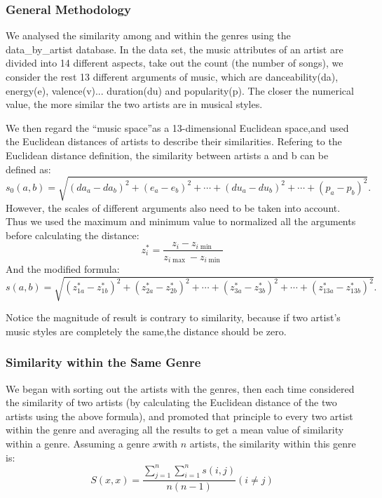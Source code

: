 \documentclass[12pt]{article}
\begin{document}
\subsubsection{General Methodology}\quad \;
We analysed the similarity among and within the genres using the data\_by\_artist database. In the data set, the music attributes of an artist are divided into 14 different aspects, take out the count (the number of songs), we consider the rest 13 different arguments of music, which are danceability(da), energy(e), valence(v)... duration(du) and popularity(p). The closer the numerical value, the more similar the two artists are in musical styles. 

We then regard the ``music space''as a 13-dimensional Euclidean space,and used the Euclidean distances of artists to describe their similarities. Refering to the Euclidean distance definition, the similarity between artists a and b can be defined as:
$${\displaystyle s_0(a,b)={\sqrt {(da_{a}-da_{b})^{2}+(e_{a}-e_{b})^{2}+\cdots +(du_{a}-du_{b})^{2}+\cdots +(p_{a}-p_{b})^{2}}}.}$$
However, the scales of different arguments also need to be taken into account. Thus we used the maximum and minimum value to normalized all the arguments before calculating the distance:
\[z_i^* = \frac{{{z_i} - {z_{i\min }}}}{{{z_{i\max }} - {z_{i\min }}}}\]
And the modified formula:
$${\displaystyle s(a,b)={\sqrt {(z_{1a}^*-z_{1b}^*)^{2}+(z_{2a}^*-z_{2b}^*)^{2}+\cdots +(z_{3a}^*-z_{3b}^*)^{2}+\cdots +(z_{13a}^*-z_{13b}^*)^{2}}}.}$$

Notice the magnitude of result is contrary to similarity, because if two artist's music styles are completely the same,the distance should be zero. 
\subsubsection{Similarity within the Same Genre}\quad \;
We began with sorting out the artists with the genres, then
each time considered the similarity of two artists (by calculating the Euclidean distance of the two artists using the above formula), and promoted that principle to every two artist within the genre and averaging all the results to get a mean value of similarity within a genre.  
Assuming a genre  ${\displaystyle x}$with ${\displaystyle n}$ artists, the similarity within this genre is:
\[S(x,x) = \frac{{\sum\limits_{j = 1}^n {\sum\limits_{i = 1}^n {s(i,j)} } }}{{n(n - 1)}}(i \ne j)\]
\end{document}
